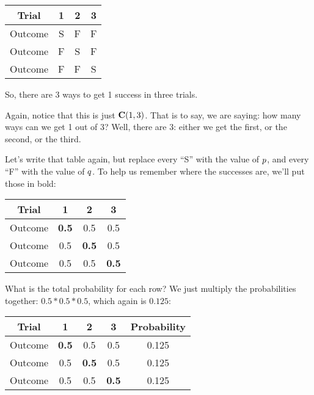 \documentclass[../../../main.tex]{subfiles}
\begin{document}
\begin{center}
  \begin{tabular}{| c | c | c | c |}
    \hline
      \textbf{Trial} & \textbf{1} & \textbf{2} & \textbf{3} \\ \hline
      Outcome & S & F & F \\ \hline
      Outcome & F & S & F \\ \hline
      Outcome & F & F & S \\ \hline
  \end{tabular}
\end{center}

\noindent
So, there are 3 ways to get 1 success in three trials.

Again, notice that this is just $\mathbf{C}(1, 3)$. That is to say, we are saying: how many ways can we get 1 out of 3? Well, there are 3: either we get the first, or the second, or the third.

Let's write that table again, but replace every ``S'' with the value of $\success/$, and every ``F'' with the value of $\failure/$. To help us remember where the successes are, we'll put those in bold:

\begin{center}
  \begin{tabular}{| c | c | c | c |}
    \hline
      \textbf{Trial} & \textbf{1} & \textbf{2} & \textbf{3} \\ \hline
  Outcome & \textbf{0.5} & 0.5 & 0.5 \\ \hline
  Outcome & 0.5 & \textbf{0.5} & 0.5 \\ \hline
  Outcome & 0.5 & 0.5 & \textbf{0.5} \\ \hline
  \end{tabular}
\end{center}

\noindent
What is the total probability for each row? We just multiply the probabilities together: $0.5 * 0.5 * 0.5$, which again is $0.125$:

\begin{center}
  \begin{tabular}{| c | c | c | c | c |}
    \hline
    \textbf{Trial} & \textbf{1} & \textbf{2} & \textbf{3} & \textbf{Probability} \\ \hline
  Outcome & \textbf{0.5} & 0.5 & 0.5 & 0.125 \\ \hline
  Outcome & 0.5 & \textbf{0.5} & 0.5 & 0.125 \\ \hline
  Outcome & 0.5 & 0.5 & \textbf{0.5} & 0.125 \\ \hline
  \end{tabular}
\end{center}
\end{document}

